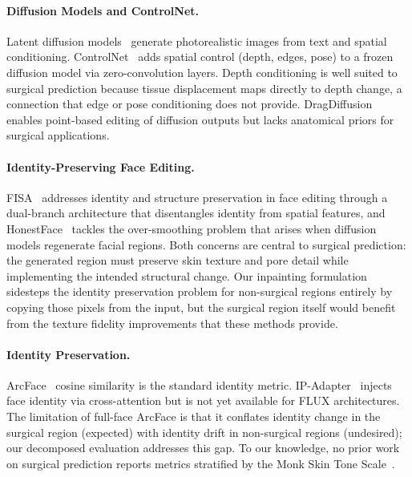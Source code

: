 \documentclass[twocolumn]{article}
\begin{document}
\paragraph{Diffusion Models and ControlNet.}
Latent diffusion models~\cite{rombach2022latent} generate photorealistic
images from text and spatial conditioning. ControlNet~\cite{zhang2023controlnet}
adds spatial control (depth, edges, pose) to a frozen diffusion model via
zero-convolution layers. Depth conditioning is well suited to surgical
prediction because tissue displacement maps directly to depth change, a
connection that edge or pose conditioning does not provide.
DragDiffusion~\cite{shi2024dragdiffusion} enables point-based editing of
diffusion outputs but lacks anatomical priors for surgical applications.

\paragraph{Identity-Preserving Face Editing.}
FISA~\cite{fisa2026} addresses identity and structure preservation in
face editing through a dual-branch architecture that disentangles identity
from spatial features, and HonestFace~\cite{honestface2025} tackles the
over-smoothing problem that arises when diffusion models regenerate
facial regions. Both concerns are central to surgical prediction:
the generated region must preserve skin texture and pore detail
while implementing the intended structural change. Our inpainting
formulation sidesteps the identity preservation problem for non-surgical
regions entirely by copying those pixels from the input, but the surgical
region itself would benefit from the texture fidelity improvements that
these methods provide.

\paragraph{Identity Preservation.}
ArcFace~\cite{deng2019arcface} cosine similarity is the standard identity
metric. IP-Adapter~\cite{ye2023ipadapter} injects face identity via
cross-attention but is not yet available for FLUX architectures. The
limitation of full-face ArcFace is that it conflates identity change in
the surgical region (expected) with identity drift in non-surgical regions
(undesired); our decomposed evaluation addresses this gap. To our knowledge,
no prior work on surgical prediction reports metrics stratified by the Monk
Skin Tone Scale~\cite{monk2023monk}.
\end{document}
